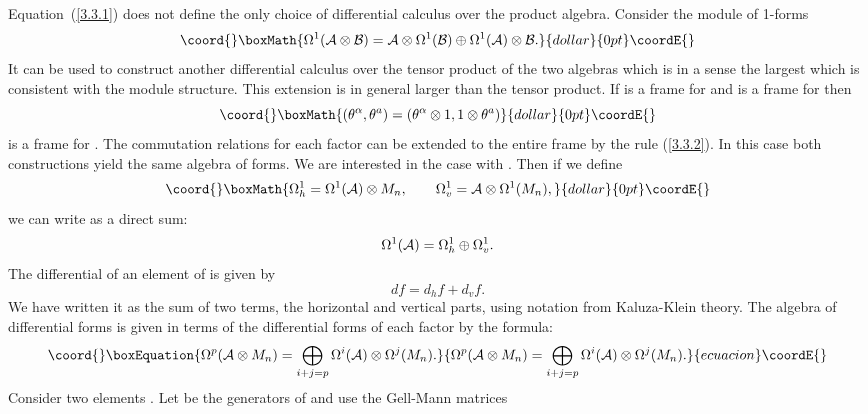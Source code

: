 \documentclass[a4paper,12pt]{article}
\def\c#1{{\cal #1}}
\begin{document}
Equation~(\ref{3.3.1}) does not define the only choice of differential
calculus over the product algebra. Consider the module of 1-forms
$$\coord{}\boxMath{
\Omega^1(\c{A} \otimes \c{B}) = \c{A} \otimes \Omega^1(\c{B})
\oplus \Omega^1(\c{A}) \otimes \c{B}.
}{dollar}{0pt}\coordE{}$$
It can be used to construct another differential calculus
\myHighlight{$\Omega^*(\c{A} \otimes \c{B})$}\coordHE{} over the tensor product of the two
algebras which is in a sense the largest which is consistent with the
module structure. This extension is in general larger than the tensor
product. If \myHighlight{$\theta^\alpha$}\coordHE{} is a frame for \myHighlight{$\Omega^1(\c{A})$}\coordHE{} and
\coordHE{} is a frame for \myHighlight{$\Omega^1(\c{B})$}\coordHE{} then
$$\coord{}\boxMath{
(\theta^\alpha, \theta^a) = (\theta^\alpha \otimes 1, 1 \otimes
\theta^a)
}{dollar}{0pt}\coordE{}$$
is a frame for \myHighlight{$\Omega^1(\c{A} \otimes \c{B})$}\coordHE{}. The commutation
relations for each factor can be extended to the entire frame by the
rule (\ref{3.3.2}). In this case both constructions yield the same
algebra of forms. We are interested in the case with \myHighlight{$\c{B} =
M_n$}\coordHE{}. Then if we define
$$\coord{}\boxMath{
\Omega^1_h = \Omega^1(\c{A}) \otimes M_n, \qquad \Omega^1_v = \c{A}
\otimes \Omega^1(M_n),
}{dollar}{0pt}\coordE{}$$
we can write \myHighlight{$\Omega^1(\c{A}\otimes M_n)$}\coordHE{} as a direct sum:
$$
\Omega^1(\c{A}) =  \Omega^1_h \oplus \Omega^1_v.             %
$$
The differential \coordHE{} of an element \coordHE{} of \myHighlight{$\c{A}$}\coordHE{} is given by
$$
df = d_hf + d_vf.                                            %
$$
We have written it as the sum of two terms, the horizontal and
vertical parts, using notation from Kaluza-Klein theory.  The algebra
\myHighlight{$\Omega^*(\c{A})$}\coordHE{} of differential forms is given in terms of the
differential forms of each factor by the formula:
\begin{equation}\coord{}\boxEquation{
\Omega^p(\c{A}\otimes M_n) = 
\bigoplus_{i+j = p} \Omega^i(\c{A})
\otimes \Omega^j(M_n).                                        \label{p-cal}
}{
\Omega^p(\c{A}\otimes M_n) = 
\bigoplus_{i+j = p} \Omega^i(\c{A})
\otimes \Omega^j(M_n).                                        }{ecuacion}\coordE{}\end{equation}
Consider two elements \myHighlight{$f,\,g \in \c{A}\otimes M_n$}\coordHE{}.  Let \coordHE{} be
the generators of \myHighlight{$\c{A}$}\coordHE{} and use the Gell-Mann matrices \coordHE{}
\end{document}
